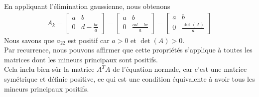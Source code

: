 \documentclass[11pt]{article}
\begin{document}
En appliquant l'élimination gaussienne, nous obtenons
\begin{align}
    A_k = \left[\begin{array}{cc}
        a & b\\
        0 & d - \frac{bc}{a}
    \end{array}\right] =
    \left[\begin{array}{cc}
        a & b\\
        0 & \frac{ad - bc}{a}
    \end{array}\right] = 
    \left[\begin{array}{cc}
        a & b\\
        0 & \frac{\det(A)}{a}
    \end{array}\right]
\end{align}
Nous savons que $a_{22}$ est positif car $a > 0$ et $\det(A) > 0$.\\
Par recurrence, nous pouvons affirmer que cette propriétés s'applique à toutes les matrices dont les mineurs principaux sont positifs.\\
Cela inclu bien-sûr la matrice $A^TA$ de l'équation normale, car c'est une matrice symétrique et définie positive, ce qui est une condition équivalente à avoir tous les mineurs principaux positifs.
\end{document}
